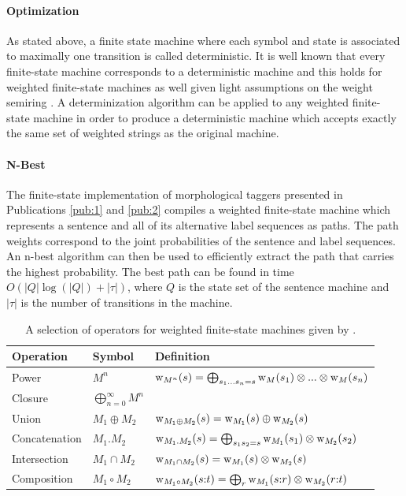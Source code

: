 \paragraph{Optimization} As stated above, a finite state machine where
each symbol and state is associated to maximally one transition is
called deterministic. It is well known that every finite-state machine
corresponds to a deterministic machine and this holds for weighted
finite-state machines as well given light assumptions on the weight
semiring \citep{Mohri2002}. A determinization algorithm can be applied
to any weighted finite-state machine in order to produce a
deterministic machine which accepts exactly the same set of weighted
strings as the original machine.

\paragraph{N-Best} The finite-state implementation of morphological
taggers presented in Publications \ref{pub:1} and \ref{pub:2} compiles
a weighted finite-state machine which represents a sentence and all of
its alternative label sequences as paths. The path weights correspond
to the joint probabilities of the sentence and label sequences. An
n-best algorithm \citep{Mohri2002} can then be used to efficiently
extract the path that carries the highest probability. The best path
can be found in time $O(|Q| \log(|Q|) + |\tau|)$, where $Q$ is the state
set of the sentence machine and $|\tau|$ is the number of transitions
in the machine.

\begin{table}[!ftb]
\begin{center}
\begin{tabular}{l|l|l}
\hline
Operation & Symbol & Definition \\
\hline
{Power} & {$M^n$} & $\mbox{${\rm w}$}_{M^n}(s) = \bigoplus_{s_1 ... s_n = s} \mbox{${\rm w}$}_{M}(s_1) \otimes ... \otimes \mbox{${\rm w}$}_{M}(s_n)$\\ 
Closure & $\bigoplus_{n = 0}^\infty M^n$ &  \\
Union & $M_1 \oplus M_2$ & $\mbox{${\rm w}$}_{M_1 \oplus M_2}(s) = \mbox{${\rm w}$}_{M_1}(s) \oplus \mbox{${\rm w}$}_{M_2}(s)$\\ 
Concatenation & $M_1.M_2$ & $\mbox{${\rm w}$}_{M_1.M_2}(s) = \bigoplus_{s_1s_2 = s} \mbox{${\rm w}$}_{M_1}(s_1) \otimes \mbox{${\rm w}$}_{M_2}(s_2)$\\
Intersection & $M_1 \cap M_2$ & $\mbox{${\rm w}$}_{M_1 \cap M_2}(s) = \mbox{${\rm w}$}_{M_1}(s) \otimes \mbox{${\rm w}$}_{M_2}(s)$ \\
Composition & $M_1 \circ M_2$ & $\mbox{${\rm w}$}_{M_1 \circ M_2}(s{\rm :}t) = \bigoplus_{r} \mbox{${\rm w}$}_{M_1}(s{\rm :}r) \otimes \mbox{${\rm w}$}_{M_2}(r{\rm :}t)$\\
\end{tabular}
\caption{A selection of operators for weighted finite-state machines
  given by
  \cite{Allauzen2007}.}\label{tab:fs-algebra}
\end{center}
\end{table}

